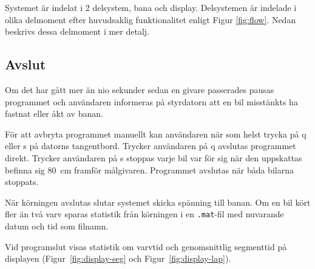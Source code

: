 Systemet är indelat i 2 delsystem, bana och display. Delsystemen är indelade i olika delmoment efter huvudsaklig funktionalitet enligt Figur
\ref{fig:flow}. Nedan beskrivs dessa delmoment i mer detalj.






\subsection{Avslut}

Om det har gått mer än nio sekunder sedan en givare passerades pausas programmet
och användaren informeras på styrdatorn att en bil misstänkts ha fastnat eller
åkt av banan. 

För att avbryta programmet manuellt kan användaren när som helst trycka på q
eller s på datorns tangentbord. Trycker användaren på q avslutas programmet
direkt. Trycker användaren på s stoppas varje bil var för sig när den uppskattas
befinna sig 80~cm framför målgivaren. Programmet avslutas när båda bilarna
stoppats.

När körningen avslutas slutar systemet skicka spänning till banan.
Om en bil kört fler än två varv sparas statistik från körningen i en
\texttt{.mat}-fil med nuvarande datum och tid som filnamn.

Vid programslut visas statistik om varvtid och genomsnittlig segmenttid på
displayen (Figur~\ref{fig:display-seg} och Figur~\ref{fig:display-lap}).

